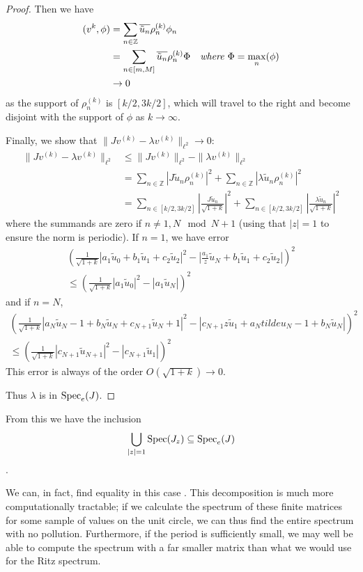 \documentclass[../main.tex]{subfiles}
\begin{document}
\begin{proof}
Then we have
\begin{align*}
  (v^{k}, \phi) & =  \sum_{n \in \mathbb{Z}}
  \overline{\tilde{u}_n} \rho_n^{(k)} \phi_n & \\
  & = \sum_{n \in [m, M]} \overline{\tilde{u}_n} \rho_n^{(k)} \Phi 
    & \text{\emph{where $\Phi = \max_{n}(\phi)$}} \\
  & \rightarrow 0 & 
\end{align*}
  as the support of $\rho_n^{(k)}$ is $[k/2, 3k/2]$, which will travel to the 
  right and become disjoint with the support of $\phi$ as $k \rightarrow \infty$.

Finally, we show that $\|Jv^{(k)} - \lambda v^{(k)}\|_{\ell^2} \rightarrow 0$:
\begin{align*}
    \|Jv^{(k)} - \lambda v^{(k)}\|_{\ell^2} & \leq \|Jv^{(k)}\|_{\ell^2}  - \|\lambda v^{(k)}\|_{\ell^2}  \\
    & = \sum_{n \in \mathbb{Z}}|J\tilde{u}_n \rho_n^{(k)}|^2 + \sum_{n \in \mathbb{Z}}|\lambda\tilde{u}_n \rho_n^{(k)}|^2 \\
    & = \sum_{n \in [k/2, 3k/2]}|\frac{J\tilde{u}_n}{\sqrt{1+k}}|^2 + \sum_{n \in [k/2, 3k/2]}|\frac{\lambda\tilde{u}_n}{\sqrt{1+k}}|^2
\end{align*}
  where the summands are zero if $n \neq {1, N}\mod N+1$ (using that $|z| = 1$ to ensure the norm is periodic).
  If $n = 1$, we have error
\begin{align*}
  (\frac{1}{\sqrt{1+k}}|a_1 \tilde{u}_0 + b_1 \tilde{u}_1 + c_2 \tilde{u}_2|^2 - |\frac{a_1}{z}\tilde{u}_N + b_1 \tilde{u}_1 + c_2 \tilde{u}_2|)^2 \\
  \leq (\frac{1}{\sqrt{1+k}}|a_1 \tilde{u}_0|^2 - |a_1 \tilde{u}_N|)^2
\end{align*}
  and if $n = N$,
\begin{align*}
  (\frac{1}{\sqrt{1+k}}|a_N \tilde{u}_N-1 + b_N \tilde{u}_N + c_{N+1} \tilde{u}_N+1|^2 - |c_{N+1}z\tilde{u}_1 + a_N tilde{u}_N-1 + b_N \tilde{u}_N|)^2 \\
  \leq (\frac{1}{\sqrt{1+k}}|c_{N+1} \tilde{u}_{N+1}|^2 - |c_{N+1} \tilde{u}_1|)^2
\end{align*}
This error is always of the order $O(\sqrt{1 + k}) \rightarrow 0$.

Thus $\lambda$ is in $\mathrm{Spec}_e(J)$. \end{proof} From this we have the inclusion
$$\bigcup_{|z|=1} \mathrm{Spec}(J_z) \subseteq \mathrm{Spec}_e(J)$$.

We can, in fact, find equality in this case \cite{teschl2000jacobi}. 
This decomposition is much more
computationally tractable; if we calculate the spectrum of these finite
matrices for some sample of values on the unit circle, we can thus find the
entire spectrum with no pollution. Furthermore, if the period is sufficiently
small, we may well be able to compute the spectrum with a far smaller matrix
than what we would use for the Ritz spectrum.
\end{document}
